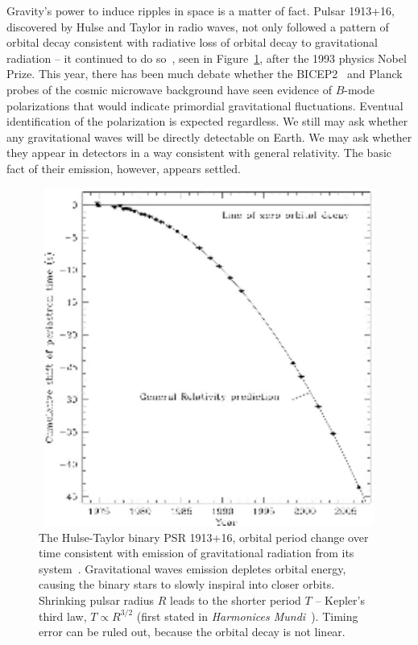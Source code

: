		Gravity's power to induce ripples in space is a matter of fact. Pulsar 1913+16, discovered by Hulse and Taylor in radio waves, not only followed a pattern of orbital decay consistent with radiative loss of orbital decay to gravitational radiation -- it continued to do so~\cite{WeisbergTaylor2004,Weisberg2010}, seen in Figure~\ref{Hulse-Taylor_binary}, after the 1993 physics Nobel Prize. 
This year, there has been much debate whether the BICEP2~\cite{BICEP2014} and Planck~\cite{Planck2014} probes of the cosmic microwave background have seen evidence of $B$-mode polarizations that would indicate primordial gravitational fluctuations.
Eventual identification of the polarization is expected regardless. 
We still may ask whether any gravitational waves will be directly detectable on Earth. 
We may ask whether they appear in detectors in a way consistent with general relativity. 
The basic fact of their emission, however, appears settled.

	\begin{figure}
	\begin{center}
	\includegraphics[height=111mm, width=148mm]{500px-PSR_B1913+16_period_shift_graph.eps}
	\caption{The Hulse-Taylor binary PSR 1913+16, orbital period change over time consistent with emission of gravitational radiation from its system~\cite{Weisberg2010}. Gravitational waves emission depletes orbital energy, causing the binary stars to slowly inspiral into closer orbits. Shrinking pulsar radius $R$ leads to the shorter period $T$ -- Kepler's third law, $T \propto R^{3/2}$ (first stated in \textit{Harmonices Mundi}~\cite{Hawking2002}). Timing error can be ruled out, because the orbital decay is not linear.}
	\label{Hulse-Taylor_binary}
	\end{center}
	\end{figure}

